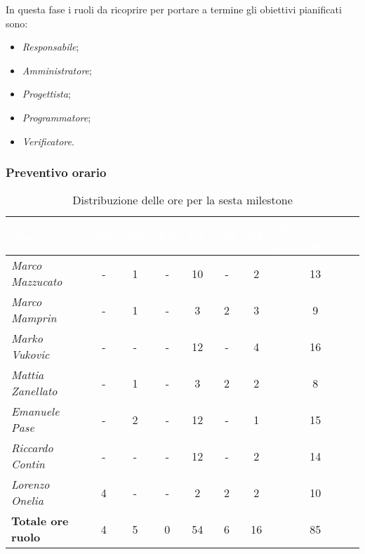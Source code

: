 In questa fase i ruoli da ricoprire per portare a termine gli obiettivi pianificati sono:
\begin{itemize}
    \item \textit{Responsabile};
    \item \textit{Amministratore};
    \item \textit{Progettista};
    \item \textit{Programmatore};
    \item \textit{Verificatore}.
\end{itemize}

\subsubsection{Preventivo orario}

\begin{table}[H]
    \renewcommand\arraystretch{1.5}
    \centering
    \begin{tabular}{|l|c|c|c|c|c|c|c|}
    \hline
    \rowcolor[HTML]{036400}
    \textcolor{white}{\textbf{Membro}} & \multicolumn{1}{l|}{\textcolor{white}{\textbf{RE}}} & \multicolumn{1}{l|}{\textcolor{white}{\textbf{AM}}} & \multicolumn{1}{l|}{\textcolor{white}{\textbf{AN}}} & \multicolumn{1}{l|}{\textcolor{white}{\textbf{PT}}} & \multicolumn{1}{l|}{\textcolor{white}{\textbf{PR}}} & \multicolumn{1}{l|}{\textcolor{white}{\textbf{VE}}} & \multicolumn{1}{l|}{\textcolor{white}{\textbf{Totale ore persona}}} \\ \hline
    \rowcolor[HTML]{EFEFEF}\textit{Marco Mazzucato}  & - & 1   & -  & 10    & -   & 2   & 13     \\ \hline
    \rowcolor[HTML]{C0C0C0}\textit{Marco Mamprin}    & - & 1   & -  & 3     & 2   & 3   & 9     \\ \hline
    \rowcolor[HTML]{EFEFEF}\textit{Marko Vukovic}    & - & -   & -  & 12    & -   & 4   & 16     \\ \hline
    \rowcolor[HTML]{C0C0C0}\textit{Mattia Zanellato} & - & 1   & -  & 3     & 2   & 2   & 8     \\ \hline
    \rowcolor[HTML]{EFEFEF}\textit{Emanuele Pase}    & - & 2   & -  & 12    & -   & 1   & 15     \\ \hline
    \rowcolor[HTML]{C0C0C0}\textit{Riccardo Contin}  & - & -   & -  & 12    & -   & 2   & 14     \\ \hline
    \rowcolor[HTML]{EFEFEF}\textit{Lorenzo Onelia}   & 4 & -   & -  & 2     & 2   & 2   & 10    \\ \hline
    \rowcolor[HTML]{C0C0C0}\textbf{Totale ore ruolo} & 4 & 5   & 0  & 54    & 6   & 16  & 85    \\ \hline
    \end{tabular}
    \caption{Distribuzione delle ore per la sesta milestone}
\end{table}

